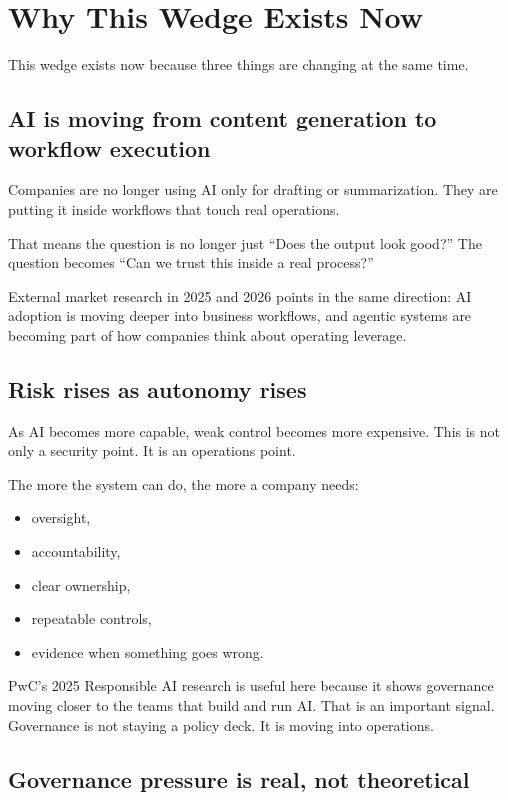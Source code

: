 \chapter{Why This Wedge Exists Now}

This wedge exists now because three things are changing at the same time.

\section{AI is moving from content generation to workflow execution}

Companies are no longer using AI only for drafting or summarization.
They are putting it inside workflows that touch real operations.

That means the question is no longer just ``Does the output look good?''
The question becomes ``Can we trust this inside a real process?''

External market research in 2025 and 2026 points in the same direction:
AI adoption is moving deeper into business workflows, and agentic systems are becoming part of how companies think about operating leverage.

\section{Risk rises as autonomy rises}

As AI becomes more capable, weak control becomes more expensive.
This is not only a security point.
It is an operations point.

The more the system can do, the more a company needs:

\begin{itemize}
  \item oversight,
  \item accountability,
  \item clear ownership,
  \item repeatable controls,
  \item evidence when something goes wrong.
\end{itemize}

PwC's 2025 Responsible AI research is useful here because it shows governance moving closer to the teams that build and run AI.
That is an important signal.
Governance is not staying a policy deck.
It is moving into operations.

\section{Governance pressure is real, not theoretical}

